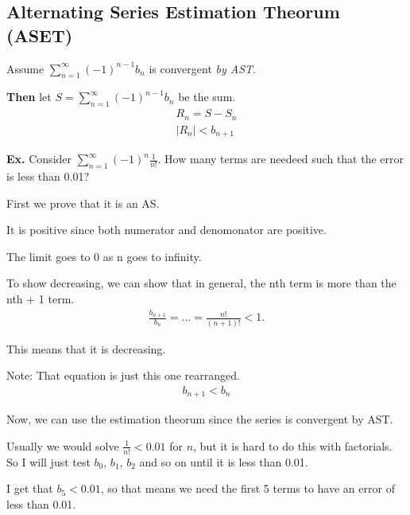 \documentclass[12pt,letterpaper]{article} \usepackage{amsmath} \usepackage{graphicx}  \usepackage{longtable}  \usepackage{amssymb}
\begin{document}
        \subsection{Alternating Series Estimation Theorum (ASET)}
        Assume $\sum^{\infty}_{n=1} (-1)^{n-1} b_n$ is convergent \emph{by AST}.

        \textbf{Then} let $S = \sum^{\infty}_{n=1} (-1)^{n-1} b_n$ be the sum.
        \begin{align*}
            R_n = S-S_n \\
            |R_n| < b_{n+1}
        \end{align*}

        \begin{mdframed}
            \textbf{Ex.} Consider $\sum^{\infty}_{n=1} (-1)^{n} \frac{1}{n!}$. How many terms are needeed such that the error is less than 0.01?

            First we prove that it is an AS. 
            
            It is positive since both numerator and denomonator are positive.

            The limit goes to 0 as n goes to infinity.

            To show decreasing, we can show that in general, the nth term is more than the nth + 1 term. 
            \begin{align*}
                \frac{b_{n+1}}{b_n} = ... = \frac{n!}{(n+1)!} < 1.
            \end{align*}
            
            This means that it is decreasing. 

            Note: That equation is just this one rearranged.
            \begin{align*}
                b_{n+1} < b_n
            \end{align*}

            Now, we can use the estimation theorum since the series is convergent by AST.

            Usually we would solve $\frac{1}{n!} < 0.01$ for $n$, but it is hard to do this with factorials. So I will just test $b_0$, $b_1$, $b_2$ and so on until it is less than 0.01. 

            I get that $b_5 < 0.01$, so that means we need the first 5 terms to have an error of less than 0.01. 
        \end{mdframed}
\end{document}
